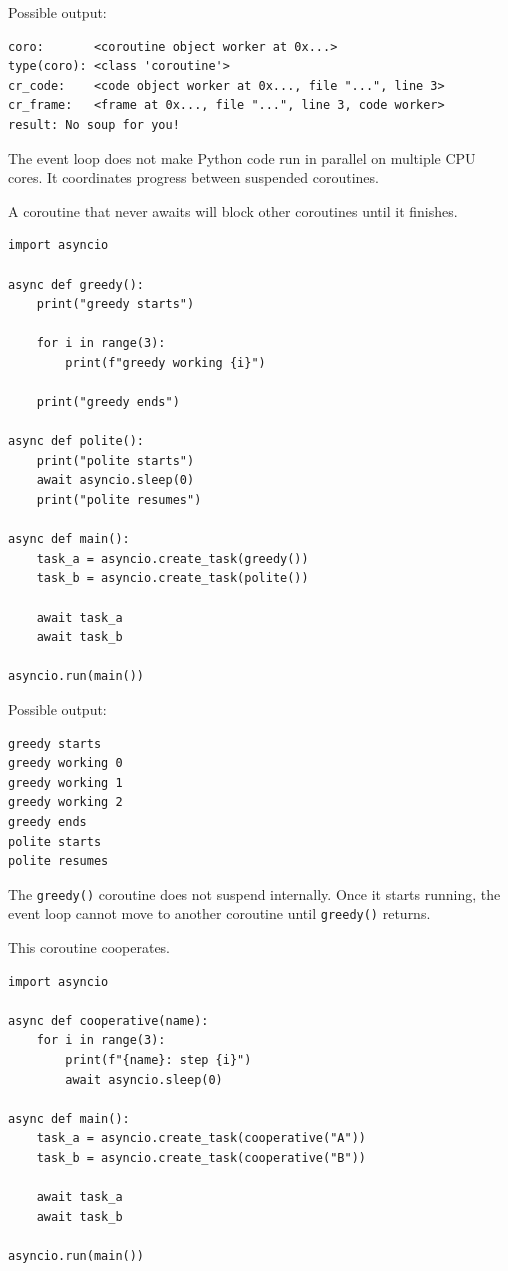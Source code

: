 Possible output:

\begin{verbatim}
coro:       <coroutine object worker at 0x...>
type(coro): <class 'coroutine'>
cr_code:    <code object worker at 0x..., file "...", line 3>
cr_frame:   <frame at 0x..., file "...", line 3, code worker>
result: No soup for you!
\end{verbatim}

The event loop does not make Python code run in parallel on multiple CPU cores. It coordinates progress between suspended coroutines.

A coroutine that never awaits will block other coroutines until it finishes.

\begin{verbatim}
import asyncio

async def greedy():
    print("greedy starts")

    for i in range(3):
        print(f"greedy working {i}")

    print("greedy ends")

async def polite():
    print("polite starts")
    await asyncio.sleep(0)
    print("polite resumes")

async def main():
    task_a = asyncio.create_task(greedy())
    task_b = asyncio.create_task(polite())

    await task_a
    await task_b

asyncio.run(main())
\end{verbatim}

Possible output:

\begin{verbatim}
greedy starts
greedy working 0
greedy working 1
greedy working 2
greedy ends
polite starts
polite resumes
\end{verbatim}

The \texttt{greedy()} coroutine does not suspend internally. Once it starts running, the event loop cannot move to another coroutine until \texttt{greedy()} returns.

This coroutine cooperates.

\begin{verbatim}
import asyncio

async def cooperative(name):
    for i in range(3):
        print(f"{name}: step {i}")
        await asyncio.sleep(0)

async def main():
    task_a = asyncio.create_task(cooperative("A"))
    task_b = asyncio.create_task(cooperative("B"))

    await task_a
    await task_b

asyncio.run(main())
\end{verbatim}

